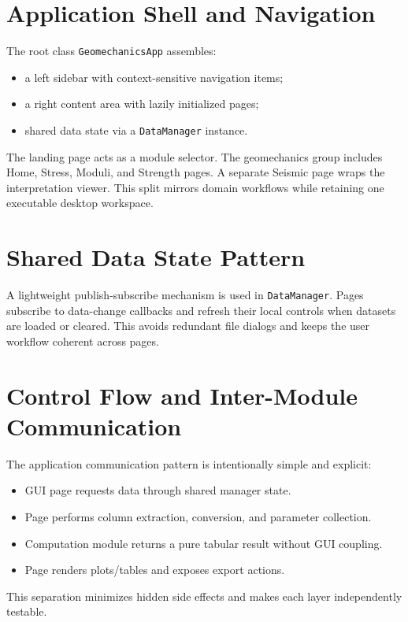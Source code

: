 \documentclass[12pt,a4paper]{report}
\begin{document}
\section{Application Shell and Navigation}
The root class \texttt{GeomechanicsApp} assembles:
\begin{itemize}
    \item a left sidebar with context-sensitive navigation items;
    \item a right content area with lazily initialized pages;
    \item shared data state via a \texttt{DataManager} instance.
\end{itemize}

The landing page acts as a module selector. The geomechanics group includes Home, Stress, Moduli, and Strength pages. A separate Seismic page wraps the interpretation viewer. This split mirrors domain workflows while retaining one executable desktop workspace.

\section{Shared Data State Pattern}
A lightweight publish-subscribe mechanism is used in \texttt{DataManager}. Pages subscribe to data-change callbacks and refresh their local controls when datasets are loaded or cleared. This avoids redundant file dialogs and keeps the user workflow coherent across pages.

\section{Control Flow and Inter-Module Communication}
The application communication pattern is intentionally simple and explicit:
\begin{itemize}
    \item GUI page requests data through shared manager state.
    \item Page performs column extraction, conversion, and parameter collection.
    \item Computation module returns a pure tabular result without GUI coupling.
    \item Page renders plots/tables and exposes export actions.
\end{itemize}

This separation minimizes hidden side effects and makes each layer independently testable.
\end{document}
